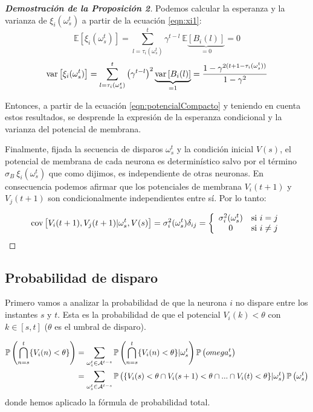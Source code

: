 \begin{proof}[\bf{Demostración de la Proposición 2}]
Podemos calcular la esperanza y la varianza de $\xi_i(\omega_s^t)$ a partir de la ecuación \eqref{eqn:xi1}:
\begin{equation*}
    \mathbb{E}[\xi_i(\omega_s^t)] = \sum_{l=\tau_i(\omega_s^t)}^t \gamma^{t-l} \  \mathbb{E}\underbrace{[B_i(l)]}_{=0} =0
\end{equation*}
\begin{equation*}
    \text{var}\left[\xi_i(\omega_s^t)\right] = \sum_{l=\tau_i(\omega_s^t)}^t \left(\gamma^{t-l}\right)^2 \underbrace{\text{var}\left[B_i(l)\right]}_{=1} = \frac{1-\gamma^{2(t+1-\tau_i(\omega_s^t))}}{1-\gamma^2}
\end{equation*}

Entonces, a partir de la ecuación \eqref{eqn:potencialCompacto} y teniendo en cuenta estos resultados, se desprende la expresión de la esperanza condicional y la varianza del potencial de membrana.

Finalmente, fijada la secuencia de disparos $\omega_s^t$ y la condición inicial $V(s)$, el potencial de membrana de cada neurona es determinístico salvo por el término $\sigma_B \  \xi_i(\omega_s^t)$ que como dijimos, es independiente de otras neuronas.
En consecuencia podemos afirmar que los potenciales de membrana $V_i(t+1)$ y $V_j(t+1)$ son condicionalmente independientes entre sí. Por lo tanto:

\begin{equation}
    \text{cov}\left[V_i(t+1),V_j(t+1)|\omega_s^t, V(s)\right] = \sigma_i^2(\omega_s^t) \delta_{ij} = \left\{ \begin{array}{cl}
            \sigma_i^2(\omega_s^t)   & \text{si } i=j\\ 
             0    & \text{si } i\neq j
        \end{array}\right.
\end{equation}
\end{proof}

\subsection{Probabilidad de disparo}

Primero vamos a analizar la probabilidad de que la neurona $i$ no dispare entre los instantes $s$ y $t$. Esta es la probabilidad de que el potencial $V_i(k) < \theta$ con $k \in [s,t]$ ($\theta$ es el umbral de disparo).

\begin{align*}
    \mathbb{P}\left( \bigcap_{n=s}^t \{ V_i(n) < \theta \} \right) & =
    \sum_{\omega_s^t \in \mathcal{A}^{t-s}}
       \mathbb{P}\left( \bigcap_{n=s}^t \{ V_i(n) < \theta\} | \omega_s^t \right) \mathbb{P}\left(omega_s^t\right)\\
     & =     \sum_{\omega_s^t \in \mathcal{A}^{t-s}}
       \mathbb{P}\left( \{ V_i(s) < \theta \cap  V_i(s+1) < \theta \cap... \cap V_i(t) < \theta \} | \omega_s^t \right) \mathbb{P}\left(\omega_s^t\right)
\end{align*}
donde hemos aplicado la fórmula de probabilidad total.

